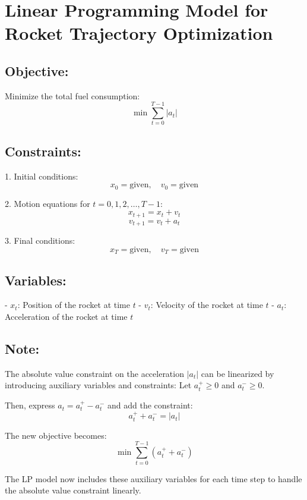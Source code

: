 \documentclass{article}
\begin{document}
\section*{Linear Programming Model for Rocket Trajectory Optimization}

\subsection*{Objective:}
Minimize the total fuel consumption:
\[
\min \sum_{t=0}^{T-1} |a_t|
\]

\subsection*{Constraints:}

1. Initial conditions:
   \[
   x_0 = \text{given}, \quad v_0 = \text{given}
   \]

2. Motion equations for \( t = 0, 1, 2, \ldots, T-1 \):
   \[
   x_{t+1} = x_t + v_t 
   \]
   \[
   v_{t+1} = v_t + a_t
   \]

3. Final conditions:
   \[
   x_T = \text{given}, \quad v_T = \text{given}
   \]

\subsection*{Variables:}
- \( x_t \): Position of the rocket at time \( t \)
- \( v_t \): Velocity of the rocket at time \( t \)
- \( a_t \): Acceleration of the rocket at time \( t \)

\subsection*{Note:}
The absolute value constraint on the acceleration \(|a_t|\) can be linearized by introducing auxiliary variables and constraints:
Let \( a_t^+ \geq 0 \) and \( a_t^- \geq 0 \).

Then, express \( a_t = a_t^+ - a_t^- \) and add the constraint:
\[
a_t^+ + a_t^- = |a_t|
\]

The new objective becomes:
\[
\min \sum_{t=0}^{T-1} (a_t^+ + a_t^-)
\]

The LP model now includes these auxiliary variables for each time step to handle the absolute value constraint linearly.
\end{document}
